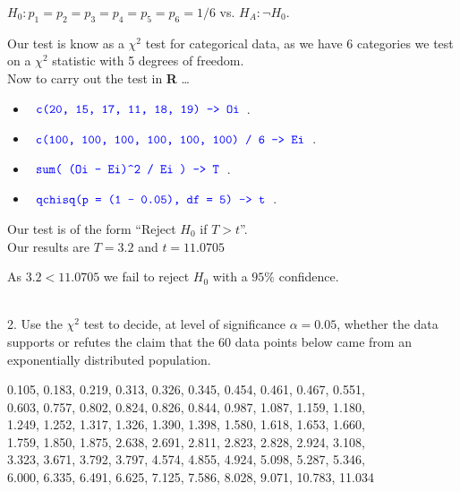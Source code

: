\documentclass[12pt]{article}
\newcommand{\XB}{\color{black}}
\newcommand{\XBB}{\color{blue}}
\newcommand{\ds}{\displaystyle}
\begin{document}
\begin{center}
    $ H_{0} : p_{1} = p_{2} = p_{3} = p_{4} = p_{5} = p_{6} = 1/6 $ vs. $ H_{A} : \lnot H_{0} $. \\
\end{center}

\noindent
Our test is know as a $ \chi^{2} $ test for categorical data,
as we have 6 categories we test on a $ \chi^{2} $ statistic with 5 degrees of freedom. \\

\noindent
Now to carry out the test in \textbf{R} \dots \\

\begin{itemize}
    \item $ \ds {\XBB \texttt{ c(20, 15, 17, 11, 18, 19) -> Oi }} $.
    \item $ \ds {\XBB \texttt{ c(100, 100, 100, 100, 100, 100) / 6 -> Ei }} $.
    \item $ \ds {\XBB \texttt{ sum( (Oi - Ei)} \verb|^| \texttt{2 / Ei ) -> T }} $.
    \item $ \ds {\XBB \texttt{ qchisq(p = (1 - 0.05), df = 5) -> t }} $. \\
\end{itemize}

\noindent
Our test is of the form ``Reject $ H_{0} $ if $ T > t $''. \\

Our results are $ T = 3.2 $ and $ t = 11.0705 $

As $ 3.2 < 11.0705 $ we fail to reject $ H_{0} $ with a $ 95\% $ confidence.

\vspace{2.5mm}

\newpage
\XBB\hrulefill\XB \\

2. Use the $ \chi^{2} $ test to decide, at level of significance $ \alpha = 0.05 $, whether the data supports
or refutes the claim that the 60 data points below came from an exponentially distributed population.  \\

\begin{center}
    0.105, 0.183, 0.219, 0.313, 0.326, 0.345, 0.454, 0.461, 0.467, 0.551, \\
    0.603, 0.757, 0.802, 0.824, 0.826, 0.844, 0.987, 1.087, 1.159, 1.180, \\
    1.249, 1.252, 1.317, 1.326, 1.390, 1.398, 1.580, 1.618, 1.653, 1.660, \\
    1.759, 1.850, 1.875, 2.638, 2.691, 2.811, 2.823, 2.828, 2.924, 3.108, \\
    3.323, 3.671, 3.792, 3.797, 4.574, 4.855, 4.924, 5.098, 5.287, 5.346, \\
    6.000, 6.335, 6.491, 6.625, 7.125, 7.586, 8.028, 9.071, 10.783, 11.034
\end{center}
\end{document}
